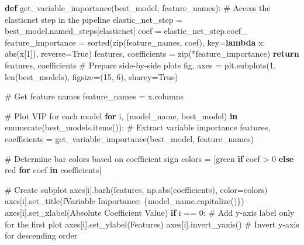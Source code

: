 \documentclass[
  letterpaper,
  DIV=11,
  numbers=noendperiod]{scrreprt}
\newenvironment{Shaded}{\begin{snugshade}}{\end{snugshade}}
\newcommand{\BuiltInTok}[1]{\textcolor[rgb]{0.00,0.23,0.31}{#1}}
\newcommand{\CommentTok}[1]{\textcolor[rgb]{0.37,0.37,0.37}{#1}}
\newcommand{\ControlFlowTok}[1]{\textcolor[rgb]{0.00,0.23,0.31}{\textbf{#1}}}
\newcommand{\DecValTok}[1]{\textcolor[rgb]{0.68,0.00,0.00}{#1}}
\newcommand{\KeywordTok}[1]{\textcolor[rgb]{0.00,0.23,0.31}{\textbf{#1}}}
\newcommand{\NormalTok}[1]{\textcolor[rgb]{0.00,0.23,0.31}{#1}}
\newcommand{\OperatorTok}[1]{\textcolor[rgb]{0.37,0.37,0.37}{#1}}
\newcommand{\SpecialCharTok}[1]{\textcolor[rgb]{0.37,0.37,0.37}{#1}}
\newcommand{\SpecialStringTok}[1]{\textcolor[rgb]{0.13,0.47,0.30}{#1}}
\newcommand{\StringTok}[1]{\textcolor[rgb]{0.13,0.47,0.30}{#1}}
\newcommand{\VariableTok}[1]{\textcolor[rgb]{0.07,0.07,0.07}{#1}}
\begin{document}
\begin{Shaded}
\begin{Highlighting}[]
\KeywordTok{def}\NormalTok{ get\_variable\_importance(best\_model, feature\_names):}
    \CommentTok{\# Access the \textquotesingle{}elasticnet\textquotesingle{} step in the pipeline}
\NormalTok{    elastic\_net\_step }\OperatorTok{=}\NormalTok{ best\_model.named\_steps[}\StringTok{\textquotesingle{}elasticnet\textquotesingle{}}\NormalTok{]}
\NormalTok{    coef }\OperatorTok{=}\NormalTok{ elastic\_net\_step.coef\_}
\NormalTok{    feature\_importance }\OperatorTok{=} \BuiltInTok{sorted}\NormalTok{(}\BuiltInTok{zip}\NormalTok{(feature\_names, coef), key}\OperatorTok{=}\KeywordTok{lambda}\NormalTok{ x: }\BuiltInTok{abs}\NormalTok{(x[}\DecValTok{1}\NormalTok{]), reverse}\OperatorTok{=}\VariableTok{True}\NormalTok{)}
\NormalTok{    features, coefficients }\OperatorTok{=} \BuiltInTok{zip}\NormalTok{(}\OperatorTok{*}\NormalTok{feature\_importance)}
    \ControlFlowTok{return}\NormalTok{ features, coefficients}
\CommentTok{\# Prepare side{-}by{-}side plots}
\NormalTok{fig, axes }\OperatorTok{=}\NormalTok{ plt.subplots(}\DecValTok{1}\NormalTok{, }\BuiltInTok{len}\NormalTok{(best\_models), figsize}\OperatorTok{=}\NormalTok{(}\DecValTok{15}\NormalTok{, }\DecValTok{6}\NormalTok{), sharey}\OperatorTok{=}\VariableTok{True}\NormalTok{)}

\CommentTok{\# Get feature names}
\NormalTok{feature\_names }\OperatorTok{=}\NormalTok{ x.columns}

\CommentTok{\# Plot VIP for each model}
\ControlFlowTok{for}\NormalTok{ i, (model\_name, best\_model) }\KeywordTok{in} \BuiltInTok{enumerate}\NormalTok{(best\_models.items()):}
    \CommentTok{\# Extract variable importance}
\NormalTok{    features, coefficients }\OperatorTok{=}\NormalTok{ get\_variable\_importance(best\_model, feature\_names)}
    
    \CommentTok{\# Determine bar colors based on coefficient sign}
\NormalTok{    colors }\OperatorTok{=}\NormalTok{ [}\StringTok{\textquotesingle{}green\textquotesingle{}} \ControlFlowTok{if}\NormalTok{ coef }\OperatorTok{\textgreater{}} \DecValTok{0} \ControlFlowTok{else} \StringTok{\textquotesingle{}red\textquotesingle{}} \ControlFlowTok{for}\NormalTok{ coef }\KeywordTok{in}\NormalTok{ coefficients]}
    
    \CommentTok{\# Create subplot}
\NormalTok{    axes[i].barh(features, np.}\BuiltInTok{abs}\NormalTok{(coefficients), color}\OperatorTok{=}\NormalTok{colors)}
\NormalTok{    axes[i].set\_title(}\SpecialStringTok{f\textquotesingle{}Variable Importance: }\SpecialCharTok{\{}\NormalTok{model\_name}\SpecialCharTok{.}\NormalTok{capitalize()}\SpecialCharTok{\}}\SpecialStringTok{\textquotesingle{}}\NormalTok{)}
\NormalTok{    axes[i].set\_xlabel(}\StringTok{\textquotesingle{}Absolute Coefficient Value\textquotesingle{}}\NormalTok{)}
    \ControlFlowTok{if}\NormalTok{ i }\OperatorTok{==} \DecValTok{0}\NormalTok{:  }\CommentTok{\# Add y{-}axis label only for the first plot}
\NormalTok{        axes[i].set\_ylabel(}\StringTok{\textquotesingle{}Features\textquotesingle{}}\NormalTok{)}
\NormalTok{    axes[i].invert\_yaxis()  }\CommentTok{\# Invert y{-}axis for descending order}
    

\end{Highlighting}
\end{Shaded}
\end{document}
